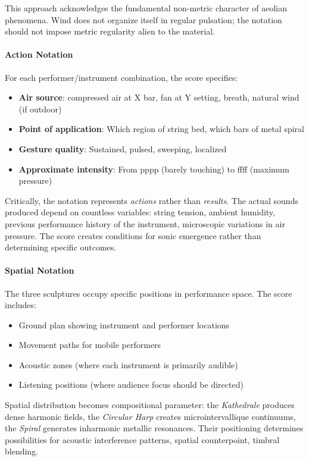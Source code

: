 This approach acknowledges the fundamental non-metric character of aeolian 
phenomena. Wind does not organize itself in regular pulsation; the notation 
should not impose metric regularity alien to the material.

\paragraph{Action Notation}
For each performer/instrument combination, the score specifies:
\begin{itemize}
  \item \textbf{Air source}: compressed air at X bar, fan at Y setting, breath, 
  natural wind (if outdoor)
  \item \textbf{Point of application}: Which region of string bed, which bars 
  of metal spiral
  \item \textbf{Gesture quality}: Sustained, pulsed, sweeping, localized
  \item \textbf{Approximate intensity}: From pppp (barely touching) to ffff 
  (maximum pressure)
\end{itemize}

Critically, the notation represents \emph{actions} rather than \emph{results}. 
The actual sounds produced depend on countless variables: string tension, 
ambient humidity, previous performance history of the instrument, microscopic 
variations in air pressure. The score creates conditions for sonic emergence 
rather than determining specific outcomes.

\paragraph{Spatial Notation}
The three sculptures occupy specific positions in performance space. The score 
includes:
\begin{itemize}
  \item Ground plan showing instrument and performer locations
  \item Movement paths for mobile performers
  \item Acoustic zones (where each instrument is primarily audible)
  \item Listening positions (where audience focus should be directed)
\end{itemize}

Spatial distribution becomes compositional parameter: the \emph{Kathedrale} 
produces dense harmonic fields, the \emph{Circular Harp} creates microintervallique 
continuums, the \emph{Spiral} generates inharmonic metallic resonances. Their 
positioning determines possibilities for acoustic interference patterns, 
spatial counterpoint, timbral blending.

